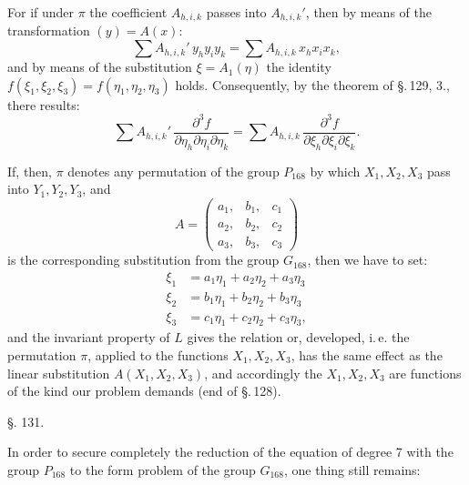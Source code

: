 
For if under $\pi$ the coefficient $A_{h,i,k}$ passes into $A_{h,i,k}'$, then by means of the transformation $(y) = A(x)$:
\[
\sum A_{h,i,k}' \, y_h y_i y_k = \sum A_{h,i,k} \, x_h x_i x_k,
\]
and by means of the substitution $\xi = A_1(\eta)$ the identity $f(\xi_1, \xi_2, \xi_3) = f(\eta_1, \eta_2, \eta_3)$ holds. Consequently, by the theorem of \S.\,129, 3., there results:
\[
\sum A_{h,i,k}' \, \frac{\partial^3 f}{\partial\eta_h\partial\eta_i\partial\eta_k} = \sum A_{h,i,k} \, \frac{\partial^3 f}{\partial\xi_h\partial\xi_i\partial\xi_k}.
\]

If, then, $\pi$ denotes any permutation of the group $P_{168}$ by which $X_1, X_2, X_3$ pass into $Y_1, Y_2, Y_3$, and
\[
A = \begin{pmatrix} a_1, & b_1, & c_1\\ a_2, & b_2, & c_2\\ a_3, & b_3, & c_3 \end{pmatrix}
\]
is the corresponding substitution from the group $G_{168}$, then we have to set:
\[
\begin{aligned}
\xi_1 &= a_1\eta_1 + a_2\eta_2 + a_3\eta_3\\
\xi_2 &= b_1\eta_1 + b_2\eta_2 + b_3\eta_3\\
\xi_3 &= c_1\eta_1 + c_2\eta_2 + c_3\eta_3,
\end{aligned}
\]
and the invariant property of $L$ gives the relation
or, developed,
i.\,e. the permutation $\pi$, applied to the functions $X_1, X_2, X_3$, has the same effect as the linear substitution $A(X_1, X_2, X_3)$, and accordingly the $X_1, X_2, X_3$ are functions of the kind our problem demands (end of \S.\,128).

\begin{center}
\S. 131.

\end{center}

In order to secure completely the reduction of the equation of degree 7 with the group $P_{168}$ to the form problem of the group $G_{168}$, one thing still remains:
